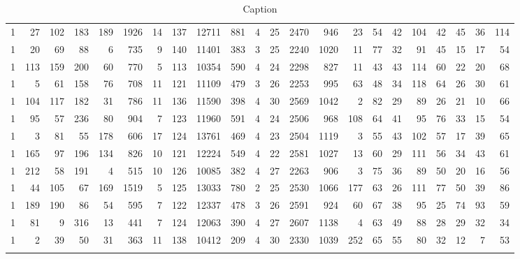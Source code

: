 {\begin{landscape}
\begin{longtable}[c]{lrrrrrrrrrrrrrrrrrrrrr}
1 & 27 & 102 & 183 & 189 & 1926 & 14 & 137 & 12711 & 881 & 4 & 25 & 2470 & 946 & 23 & 54 & 42 & 104 & 42 & 45 & 36 & 114 \\
1 & 20 & 69 & 88 & 6 & 735 & 9 & 140 & 11401 & 383 & 3 & 25 & 2240 & 1020 & 11 & 77 & 32 & 91 & 45 & 15 & 17 & 54 \\
1 & 113 & 159 & 200 & 60 & 770 & 5 & 113 & 10354 & 590 & 4 & 24 & 2298 & 827 & 11 & 43 & 43 & 114 & 60 & 22 & 20 & 68 \\
1 & 5 & 61 & 158 & 76 & 708 & 11 & 121 & 11109 & 479 & 3 & 26 & 2253 & 995 & 63 & 48 & 34 & 118 & 64 & 26 & 30 & 61 \\
1 & 104 & 117 & 182 & 31 & 786 & 11 & 136 & 11590 & 398 & 4 & 30 & 2569 & 1042 & 2 & 82 & 29 & 89 & 26 & 21 & 10 & 66 \\
1 & 95 & 57 & 236 & 80 & 904 & 7 & 123 & 11960 & 591 & 4 & 24 & 2506 & 968 & 108 & 64 & 41 & 95 & 76 & 33 & 15 & 54 \\
1 & 3 & 81 & 55 & 178 & 606 & 17 & 124 & 13761 & 469 & 4 & 23 & 2504 & 1119 & 3 & 55 & 43 & 102 & 57 & 17 & 39 & 65 \\
1 & 165 & 97 & 196 & 134 & 826 & 10 & 121 & 12224 & 549 & 4 & 22 & 2581 & 1027 & 13 & 60 & 29 & 111 & 56 & 34 & 43 & 61 \\
1 & 212 & 58 & 191 & 4 & 515 & 10 & 126 & 10085 & 382 & 4 & 27 & 2263 & 906 & 3 & 75 & 36 & 89 & 50 & 20 & 16 & 56 \\
1 & 44 & 105 & 67 & 169 & 1519 & 5 & 125 & 13033 & 780 & 2 & 25 & 2530 & 1066 & 177 & 63 & 26 & 111 & 77 & 50 & 39 & 86 \\
1 & 189 & 190 & 86 & 54 & 595 & 7 & 122 & 12337 & 478 & 3 & 26 & 2591 & 924 & 60 & 67 & 38 & 95 & 25 & 74 & 93 & 59 \\
1 & 81 & 9 & 316 & 13 & 441 & 7 & 124 & 12063 & 390 & 4 & 27 & 2607 & 1138 & 4 & 63 & 49 & 88 & 28 & 29 & 32 & 34 \\
1 & 2 & 39 & 50 & 31 & 363 & 11 & 138 & 10412 & 209 & 4 & 30 & 2330 & 1039 & 252 & 65 & 55 & 80 & 32 & 12 & 7 & 53 \\ \hline
\caption{Caption}
\label{tab:my-table}\\
\end{longtable}
\end{landscape}
}